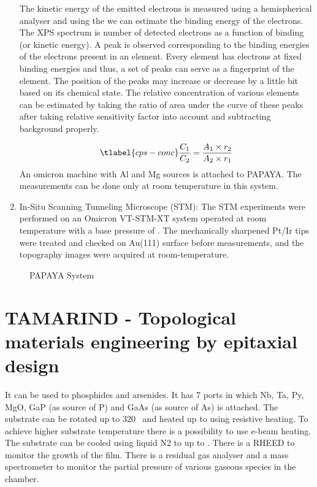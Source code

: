 \begin{enumerate}
    The kinetic energy of the emitted electrons is measured using a 
    hemispherical analyser and using the  we can estimate the 
    binding energy of the electrons. The XPS spectrum is number of detected 
    electrons as a function of binding (or kinetic energy). A peak is observed 
    corresponding to the binding energies of the electrons present in an 
    element. Every element has electrons at fixed binding energies and thus, 
    a set of peaks can serve as a fingerprint of the element. The position of 
    the peaks may increase or decrease by a little bit based on its chemical 
    state. The relative concentration of various elements can be estimated by 
    taking the ratio of area under the curve of these peaks after taking 
    relative sensitivity factor into account and subtracting background 
    properly.

    \begin{equation}
        \tlabel{cps-conc}
        \frac{C_1}{C_2} = \frac{A_1 \times r_2}{A_2 \times r_1}
    \end{equation}
    An omicron machine with Al and Mg sources is attached to PAPAYA. 
    The measurements can be done only at room temperature in this system.
    
    \item In-Situ Scanning Tunneling Microscope (STM): The STM experiments 
    were performed on an Omicron VT-STM-XT system operated at room temperature 
    with a base pressure of . The mechanically sharpened 
    Pt/Ir tips were treated and checked on Au(111) surface before measurements, 
    and the topography images were acquired at room-temperature.
\end{enumerate}

\begin{figure}
    \caption{
        PAPAYA System
    }
\end{figure}


\section{TAMARIND - Topological materials engineering by epitaxial design}
It can be used to phosphides and arsenides. It has 7 ports in which Nb, Ta, 
Py, MgO, GaP (as source of P) and GaAs (as source of As) is attached. 
The substrate can be rotated up to 320 \degree\ and heated up to  using 
resistive heating. To achieve higher substrate temperature there is a 
possibility to use e-beam heating. The substrate can be cooled using liquid 
N2 to up to . There is a RHEED to monitor the growth of the film. There is a 
residual gas analyser and a mass spectrometer to monitor the partial pressure of various 
gaseous species in the chamber. 

